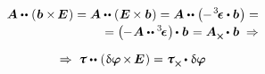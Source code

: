 \begin{otherlanguage}{russian}
\nopagebreak\vspace{-0.5em}\begin{multline*}
\bm{A} \dotdotp \hspace{-0.25ex} \left( \hspace{.1ex} \bm{b} \times \hspace{-0.2ex} \bm{E} \hspace{.1ex} \right)
= \bm{A} \dotdotp \hspace{-0.32ex} \left( \hspace{.1ex} \bm{E} \hspace{-0.12ex} \times \bm{b} \hspace{.1ex} \right)
= \bm{A} \dotdotp \hspace{-0.32ex} \left( \hspace{-0.1ex} - \hspace{.2ex} \levicivitatensor \dotp \bm{b} \hspace{.1ex} \right) =
\\[-0.2em]
%
\hspace*{\fill} = \left( \hspace{-0.1ex} - \hspace{.1ex} \bm{A} \dotdotp \levicivitatensor \hspace{.1ex} \right) \hspace{-0.2ex} \dotp \hspace{.1ex} \bm{b}
\hspace{.12ex} = \bm{A}_{\Xcompanion} \hspace{-0.1ex} \dotp \hspace{.1ex} \bm{b}
\hspace{.64ex} \Rightarrow
\end{multline*}

\nopagebreak\vspace{-0.4em}\begin{equation*}
\Rightarrow \hspace{.64ex}
\forcestresstensor \dotdotp \hspace{-0.25ex} \left( \hspace{.12ex} \variation{\fieldofrotations} \hspace{-0.2ex} \times \hspace{-0.2ex} \bm{E} \hspace{.12ex} \right)
= \forcestresstensor_{\Xcompanion} \hspace{-0.1ex} \dotp \hspace{.1ex} \variation{\fieldofrotations}
\end{equation*}


\end{otherlanguage}
